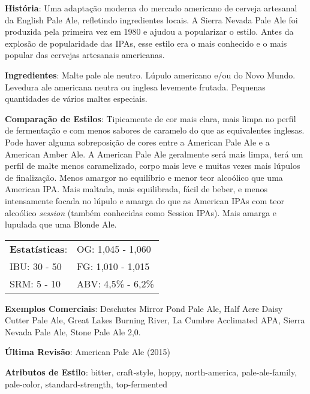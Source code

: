 \textbf{História}: Uma adaptação moderna do mercado americano de cerveja artesanal da English Pale Ale, refletindo ingredientes locais. A Sierra Nevada Pale Ale foi produzida pela primeira vez em 1980 e ajudou a popularizar o estilo. Antes da explosão de popularidade das IPAs, esse estilo era o mais conhecido e o mais popular das cervejas artesanais americanas.

\textbf{Ingredientes}: Malte pale ale neutro. Lúpulo americano e/ou do Novo Mundo. Levedura ale americana neutra ou inglesa levemente frutada. Pequenas quantidades de vários maltes especiais.

\textbf{Comparação de Estilos}: Tipicamente de cor mais clara, mais limpa no perfil de fermentação e com menos sabores de caramelo do que as equivalentes inglesas. Pode haver alguma sobreposição de cores entre a American Pale Ale e a American Amber Ale. A American Pale Ale geralmente será mais limpa, terá um perfil de malte menos caramelizado, corpo mais leve e muitas vezes mais lúpulos de finalização. Menos amargor no equilíbrio e menor teor alcoólico que uma American IPA. Mais maltada, mais equilibrada, fácil de beber, e menos intensamente focada no lúpulo e amarga do que as American IPAs com teor alcoólico \textit{session} (também conhecidas como Session IPAs). Mais amarga e lupulada que uma Blonde Ale.

\begin{tabular}{@{}p{35mm}p{35mm}@{}}
  \textbf{Estatísticas}: & OG: 1,045 - 1,060 \\
  IBU: 30 - 50  & FG: 1,010 - 1,015  \\
  SRM: 5 - 10  & ABV: 4,5\% - 6,2\%
\end{tabular}

\textbf{Exemplos Comerciais}: Deschutes Mirror Pond Pale Ale, Half Acre Daisy Cutter Pale Ale, Great Lakes Burning River, La Cumbre Acclimated APA, Sierra Nevada Pale Ale, Stone Pale Ale 2,0.

\textbf{Última Revisão}: American Pale Ale (2015)

\textbf{Atributos de Estilo}: bitter, craft-style, hoppy, north-america, pale-ale-family, pale-color, standard-strength, top-fermented
